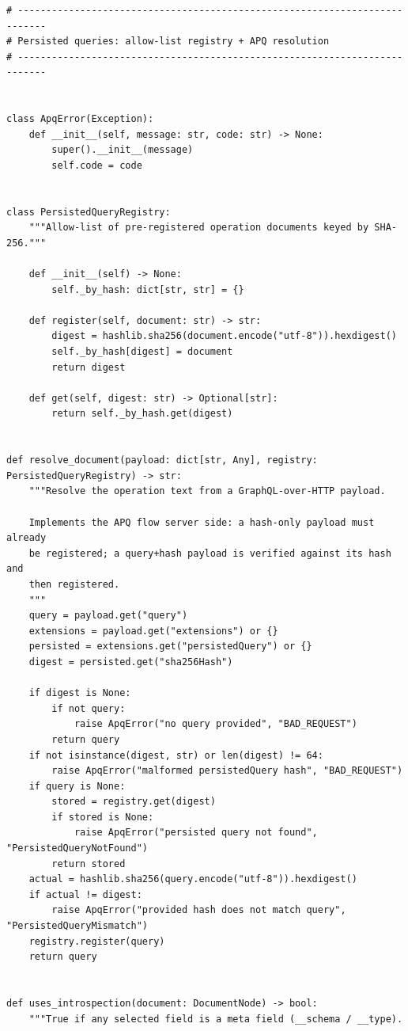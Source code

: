 \begin{verbatim}
# ---------------------------------------------------------------------------
# Persisted queries: allow-list registry + APQ resolution
# ---------------------------------------------------------------------------


class ApqError(Exception):
    def __init__(self, message: str, code: str) -> None:
        super().__init__(message)
        self.code = code


class PersistedQueryRegistry:
    """Allow-list of pre-registered operation documents keyed by SHA-256."""

    def __init__(self) -> None:
        self._by_hash: dict[str, str] = {}

    def register(self, document: str) -> str:
        digest = hashlib.sha256(document.encode("utf-8")).hexdigest()
        self._by_hash[digest] = document
        return digest

    def get(self, digest: str) -> Optional[str]:
        return self._by_hash.get(digest)


def resolve_document(payload: dict[str, Any], registry: PersistedQueryRegistry) -> str:
    """Resolve the operation text from a GraphQL-over-HTTP payload.

    Implements the APQ flow server side: a hash-only payload must already
    be registered; a query+hash payload is verified against its hash and
    then registered.
    """
    query = payload.get("query")
    extensions = payload.get("extensions") or {}
    persisted = extensions.get("persistedQuery") or {}
    digest = persisted.get("sha256Hash")

    if digest is None:
        if not query:
            raise ApqError("no query provided", "BAD_REQUEST")
        return query
    if not isinstance(digest, str) or len(digest) != 64:
        raise ApqError("malformed persistedQuery hash", "BAD_REQUEST")
    if query is None:
        stored = registry.get(digest)
        if stored is None:
            raise ApqError("persisted query not found", "PersistedQueryNotFound")
        return stored
    actual = hashlib.sha256(query.encode("utf-8")).hexdigest()
    if actual != digest:
        raise ApqError("provided hash does not match query", "PersistedQueryMismatch")
    registry.register(query)
    return query


def uses_introspection(document: DocumentNode) -> bool:
    """True if any selected field is a meta field (__schema / __type).


\end{verbatim}
